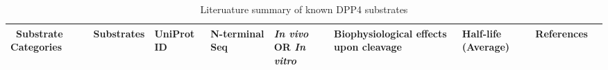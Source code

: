 \begin{table*} 
\caption {Literuature summary of known DPP4 substrates}
\label{DPP4-Sub}

\begin{tabular}{|l|l|l|l|l|l|l|l|l|}
    \hline
    \ Substrate Categories & Substrates & UniProt ID & N-terminal Seq & \textit{In vivo} OR \textit{In vitro} & Biophysiological effects upon cleavage & Half-life (Average) & References \\
    \hline
\end{tabular}
\end{table*}